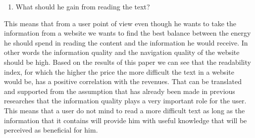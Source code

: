 \documentclass{article}
\begin{document}
\begin{itemize}
\begin{enumerate}
\item What should he gain from reading the text?
\end{enumerate}
This means that from a user point of view even though he wants to take the information from a website we wants to find the best balance between the energy he should spend in reading the content and the information he would receive. In other words the information quality and the navigation quality of the website should be high. Based on the results of this paper we can see that the readability index, for which the higher the price the more difficult the text in a website would be, has a positive correlation with the revenues. That can be translated and supported from the assumption that has already been made in previous researches that the information quality plays a very important role for the user. This means that a user do not mind to read a more difficult text as long as the information that it contains will provide him with useful knowledge that will be perceived as beneficial for him.


\end{itemize}
\end{document}
